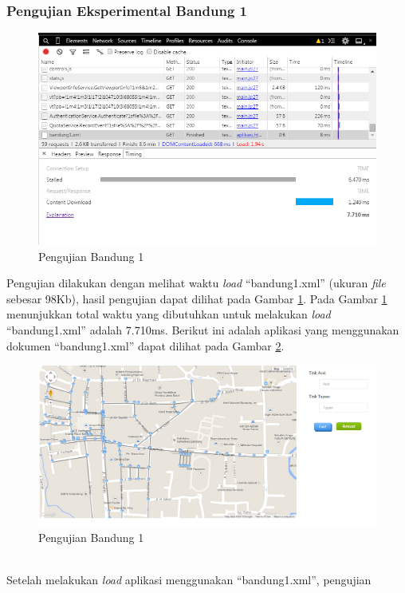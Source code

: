 \subsubsection{Pengujian Eksperimental Bandung 1}
\begin{figure}[h]
\centering
\includegraphics[scale=0.75]{Gambar/pu_bandung1}
\caption[Pengujian Bandung 1]{Pengujian Bandung 1}
\label{fig:pu_bandung1}
\end{figure}
Pengujian dilakukan dengan melihat waktu \textit{load} ``bandung1.xml''
(ukuran \textit{file} sebesar 98Kb), hasil pengujian dapat dilihat pada Gambar
\ref{fig:pu_bandung1}.
Pada Gambar \ref{fig:pu_bandung1} menunjukkan total waktu yang dibutuhkan untuk 
melakukan \textit{load} ``bandung1.xml'' adalah 7.710ms. Berikut ini
adalah aplikasi yang menggunakan dokumen ``bandung1.xml'' dapat dilihat pada
Gambar \ref{fig:bandung1_load}.
\begin{figure}[h]
\centering
\includegraphics[scale=0.45]{Gambar/bandung1_load}
\caption[Pengujian Bandung 1]{Pengujian Bandung 1}
\label{fig:bandung1_load}
\end{figure}\\
Setelah melakukan \textit{load} aplikasi menggunakan ``bandung1.xml'', pengujian
